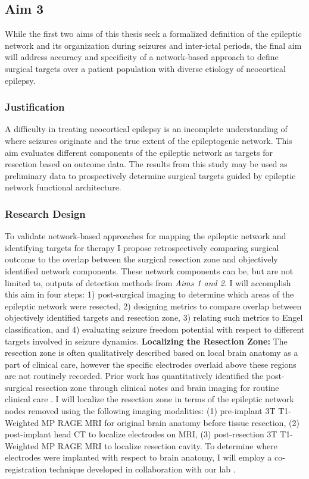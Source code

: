 \subsection{Aim 3}
While the first two aims of this thesis seek a formalized definition of the epileptic network and its organization during seizures and inter-ictal periods, the final aim will address accuracy and specificity of a network-based approach to define surgical targets over a patient population with diverse etiology of neocortical epilepsy.

\subsubsection{Justification}
A difficulty in treating neocortical epilepsy is an incomplete understanding of where seizures originate and the true extent of the epileptogenic network. This aim evaluates different components of the epileptic network as targets for resection based on outcome data. The results from this study may be used as preliminary data to prospectively determine surgical targets guided by epileptic network functional architecture.

\subsubsection{Research Design}
To validate network-based approaches for mapping the epileptic network and identifying targets for therapy I propose retrospectively comparing surgical outcome to the overlap between the surgical resection zone and objectively identified network components. These network components can be, but are not limited to, outputs of detection methods from \textit{Aims 1 and 2}. I will accomplish this aim in four steps: 1) post-surgical imaging to determine which areas of the epileptic network were resected, 2) designing metrics to compare overlap between objectively identified targets and resection zone, 3) relating such metrics to Engel classification, and 4) evaluating seizure freedom potential with respect to different targets involved in seizure dynamics.
\textbf{Localizing the Resection Zone:}
The resection zone is often qualitatively described based on local brain anatomy as a part of clinical care, however the specific electrodes overlaid above these regions are not routinely recorded. Prior work has quantitatively identified the post-surgical resection zone through clinical notes and brain imaging for routine clinical care \cite{jacobs2010highfrequency, wu2010removing}. I will localize the resection zone in terms of the epileptic network nodes removed using the following imaging modalities: (1) pre-implant 3T T1-Weighted MP RAGE MRI for original brain anatomy before tissue resection, (2) post-implant head CT to localize electrodes on MRI, (3) post-resection 3T T1-Weighted MP RAGE MRI to localize resection cavity. To determine where electrodes were implanted with respect to brain anatomy, I will employ a co-registration technique developed in collaboration with our lab \cite{wu2012brain}.


